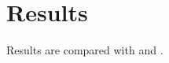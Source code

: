 \chapter{Results}
Results are compared with \citet{mittelbach04} and \citet{oetiker}.
\nocite{knuth86}
